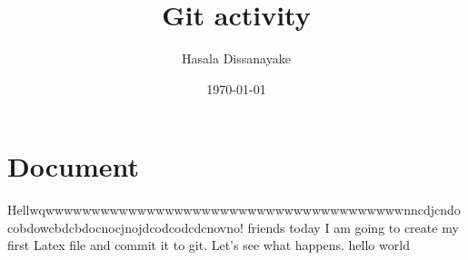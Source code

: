 \documentclass[a4 paper]{article}
\title{Git activity}
\author{Hasala Dissanayake}
\date{\today}
\begin{document}
\maketitle
\section{Document}

Hellwqwwwwwwwwwwwwwwwwwwwwwwwwwwwwwwwwwwwwwwwnncdjcndocobdowcbdcbdocnocjnojdcodcodcdcnovno! friends today I am going to create my first Latex file and commit it to git. Let's see what happens.
hello world
\end{document}
